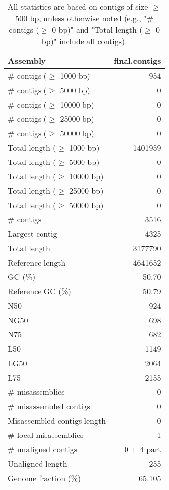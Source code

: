 \documentclass[12pt,a4paper]{article}
\begin{document}
\begin{table}[ht]
\begin{center}
\caption{All statistics are based on contigs of size $\geq$ 500 bp, unless otherwise noted (e.g., "\# contigs ($\geq$ 0 bp)" and "Total length ($\geq$ 0 bp)" include all contigs).}
\begin{tabular}{|l*{1}{|r}|}
\hline
Assembly & final.contigs \\ \hline
\# contigs ($\geq$ 1000 bp) & 954 \\ \hline
\# contigs ($\geq$ 5000 bp) & 0 \\ \hline
\# contigs ($\geq$ 10000 bp) & 0 \\ \hline
\# contigs ($\geq$ 25000 bp) & 0 \\ \hline
\# contigs ($\geq$ 50000 bp) & 0 \\ \hline
Total length ($\geq$ 1000 bp) & 1401959 \\ \hline
Total length ($\geq$ 5000 bp) & 0 \\ \hline
Total length ($\geq$ 10000 bp) & 0 \\ \hline
Total length ($\geq$ 25000 bp) & 0 \\ \hline
Total length ($\geq$ 50000 bp) & 0 \\ \hline
\# contigs & 3516 \\ \hline
Largest contig & 4325 \\ \hline
Total length & 3177790 \\ \hline
Reference length & 4641652 \\ \hline
GC (\%) & 50.70 \\ \hline
Reference GC (\%) & 50.79 \\ \hline
N50 & 924 \\ \hline
NG50 & 698 \\ \hline
N75 & 682 \\ \hline
L50 & 1149 \\ \hline
LG50 & 2064 \\ \hline
L75 & 2155 \\ \hline
\# misassemblies & 0 \\ \hline
\# misassembled contigs & 0 \\ \hline
Misassembled contigs length & 0 \\ \hline
\# local misassemblies & 1 \\ \hline
\# unaligned contigs & 0 + 4 part \\ \hline
Unaligned length & 255 \\ \hline
Genome fraction (\%) & 65.105 \\ \hline

\end{tabular}
\end{center}
\end{table}
\end{document}
